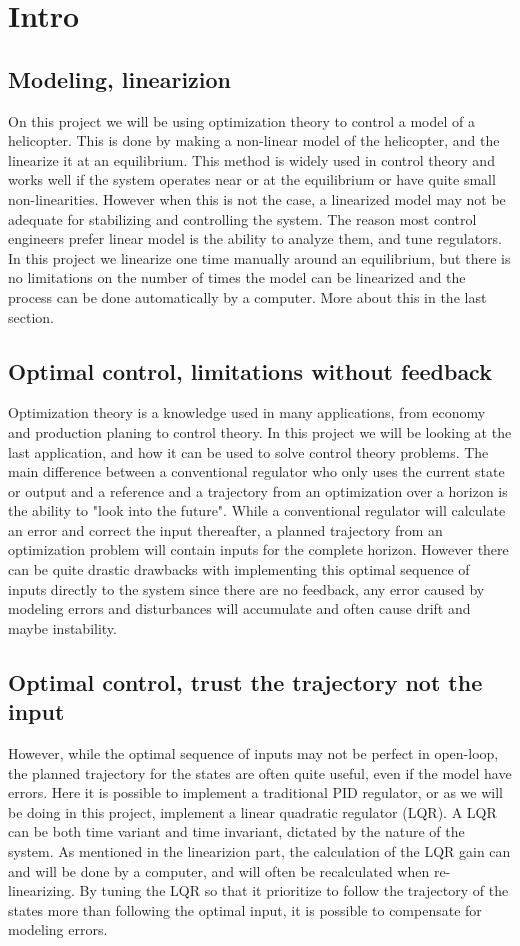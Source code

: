 \section{Intro}
\subsection{Modeling, linearizion}
On this project we will be using optimization theory to control a model of a helicopter. This is done by making a non-linear model of the helicopter, and the linearize it at an equilibrium. This method is widely used in control theory and works well if the system operates near or at the equilibrium or have quite small non-linearities. However when this is not the case, a linearized model may not be adequate for stabilizing and controlling the system. The reason most control engineers prefer linear model is the ability to analyze them, and tune regulators. In this project we linearize one time manually around an equilibrium, but there is no limitations on the number of times the model can be linearized and the process can be done automatically by a computer. More about this in the last section.

\subsection{Optimal control, limitations without feedback}
Optimization theory is a knowledge used in many applications, from economy and production planing to control theory. In this project we will be looking at the last application, and how it can be used to solve control theory problems. The main difference between a conventional regulator who only uses the current state or output and a reference and a trajectory from an optimization over a horizon is the ability to "look into the future". While a conventional regulator will calculate an error and correct the input thereafter, a planned trajectory from an optimization problem will contain inputs for the complete horizon. However there can be quite drastic drawbacks with implementing this optimal sequence of inputs directly to the system since there are no feedback, any error caused by modeling errors and disturbances will accumulate and often cause drift and maybe instability.

\subsection{Optimal control, trust the trajectory not the input}
However, while the optimal sequence of inputs may not be perfect in open-loop, the planned trajectory for the states are often quite useful, even if the model have errors. Here it is possible to implement a traditional PID regulator, or as we will be doing in this project, implement a linear quadratic regulator (LQR). A LQR can be both time variant and time invariant, dictated by the nature of the system. As mentioned in the linearizion part, the calculation of the LQR gain can and will be done by a computer, and will often be recalculated when re-linearizing. By tuning the LQR so that it prioritize to follow the trajectory of the states more than following the optimal input, it is possible to compensate for modeling errors.

